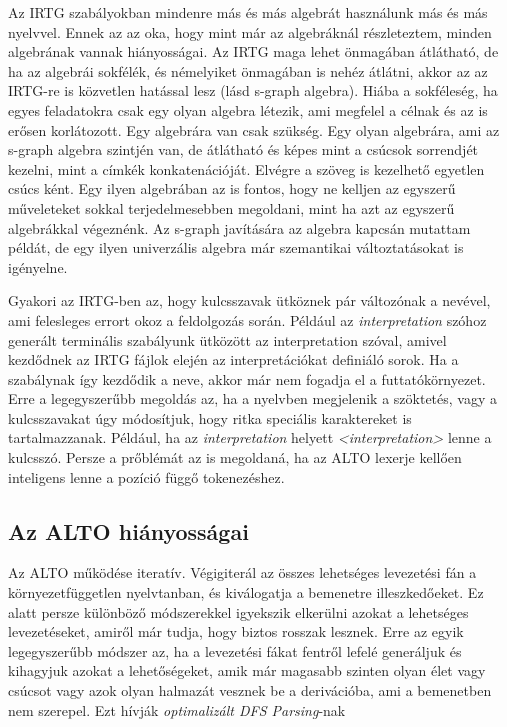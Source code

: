 Az IRTG szabályokban mindenre más és más algebrát használunk más és más nyelvvel. Ennek az az oka, hogy mint már az algebráknál részleteztem, minden algebrának vannak hiányosságai. Az IRTG maga lehet önmagában átlátható, de ha az algebrái sokfélék, és némelyiket önmagában is nehéz átlátni, akkor az az IRTG-re is közvetlen hatással lesz (lásd s-graph algebra). Hiába a sokféleség, ha egyes feladatokra csak egy olyan algebra létezik, ami megfelel a célnak és az is erősen korlátozott. Egy algebrára van csak szükség. Egy olyan algebrára, ami az s-graph algebra szintjén van, de átlátható és képes mint a csúcsok sorrendjét kezelni, mint a címkék konkatenációját. Elvégre a szöveg is kezelhető egyetlen csúcs ként. Egy ilyen algebrában az is fontos, hogy ne kelljen az egyszerű műveleteket sokkal terjedelmesebben megoldani, mint ha azt az egyszerű algebrákkal végeznénk. Az s-graph javítására az algebra kapcsán mutattam példát, de egy ilyen univerzális algebra már szemantikai változtatásokat is igényelne.


Gyakori az IRTG-ben az, hogy kulcsszavak ütköznek pár változónak a nevével, ami felesleges errort okoz a feldolgozás során. Például az \textit{interpretation} szóhoz generált terminális szabályunk ütközött az interpretation szóval, amivel kezdődnek az IRTG fájlok elején az interpretációkat definiáló sorok. Ha a szabálynak így kezdődik a neve, akkor már nem fogadja el a futtatókörnyezet. Erre a legegyszerűbb megoldás az, ha a nyelvben megjelenik a szöktetés, vagy a kulcsszavakat úgy módosítjuk, hogy ritka speciális karaktereket is tartalmazzanak. Például, ha az \textit{interpretation} helyett \textit{<interpretation>} lenne a kulcsszó. Persze a prőblémát az is megoldaná, ha az ALTO lexerje kellően inteligens lenne a pozíció függő tokenezéshez.

\subsection{Az ALTO hiányosságai}
\label{sec:ALTOshortcomming}

Az ALTO működése iteratív. Végigiterál az összes lehetséges levezetési fán a környezetfüggetlen nyelvtanban, és kiválogatja a bemenetre illeszkedőeket. Ez alatt persze különböző módszerekkel igyekszik elkerülni azokat a lehetséges levezetéseket, amiről már tudja, hogy biztos rosszak lesznek. Erre az egyik legegyszerűbb módszer az, ha a levezetési fákat fentről lefelé generáljuk és kihagyjuk azokat a lehetőségeket, amik már magasabb szinten olyan élet vagy csúcsot vagy azok olyan halmazát vesznek be a derivációba, ami a bemenetben nem szerepel. Ezt hívják \textit{optimalizált DFS Parsing}-nak

